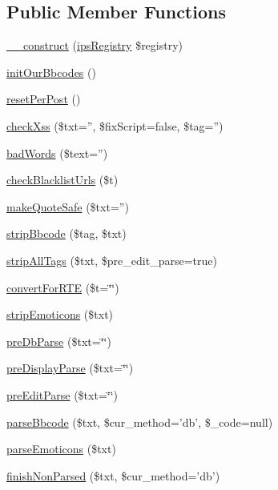\subsection*{Public Member Functions}
\begin{DoxyCompactItemize}
\item 
\hyperlink{classclass__bbcode__core_a178c3a93e57e75dd87a5d39112af0b07}{\-\_\-\-\_\-construct} (\hyperlink{classips_registry}{ips\-Registry} \$registry)
\item 
\hyperlink{classclass__bbcode__core_a52d18ae76a46598ee7da83bb73c848a8}{init\-Our\-Bbcodes} ()
\item 
\hyperlink{classclass__bbcode__core_a9d93724d48cbdd221c0bf9a7d8e6a160}{reset\-Per\-Post} ()
\item 
\hyperlink{classclass__bbcode__core_ae6b04d2901a9521709b77ab1e610827e}{check\-Xss} (\$txt='', \$fix\-Script=false, \$tag='')
\item 
\hyperlink{classclass__bbcode__core_a3c1450b996765a2c9791d59e543043af}{bad\-Words} (\$text='')
\item 
\hyperlink{classclass__bbcode__core_acc647870f282d982a13c31a065b9fbf2}{check\-Blacklist\-Urls} (\$t)
\item 
\hyperlink{classclass__bbcode__core_a5f6600d91d480e9d4cb41638af91129a}{make\-Quote\-Safe} (\$txt='')
\item 
\hyperlink{classclass__bbcode__core_a26a7bf3ee2c80161c1d154c7cb4e1ca1}{strip\-Bbcode} (\$tag, \$txt)
\item 
\hyperlink{classclass__bbcode__core_ad3cacd4e2b0fe215a49b5bbca7f3a565}{strip\-All\-Tags} (\$txt, \$pre\-\_\-edit\-\_\-parse=true)
\item 
\hyperlink{classclass__bbcode__core_a774298b1c6ee1b64ecd80f9913208fe7}{convert\-For\-R\-T\-E} (\$t=\char`\"{}\char`\"{})
\item 
\hyperlink{classclass__bbcode__core_a045622830087c0e3df475d390a07afdc}{strip\-Emoticons} (\$txt)
\item 
\hyperlink{classclass__bbcode__core_aea1919f4d4d425b66d1a63314da38aaf}{pre\-Db\-Parse} (\$txt=\char`\"{}\char`\"{})
\item 
\hyperlink{classclass__bbcode__core_abbb08647886418bf857c94e5f4262423}{pre\-Display\-Parse} (\$txt=\char`\"{}\char`\"{})
\item 
\hyperlink{classclass__bbcode__core_ad3d23bc194e2cb81f6387acb027597cd}{pre\-Edit\-Parse} (\$txt=\char`\"{}\char`\"{})
\item 
\hyperlink{classclass__bbcode__core_a1e9f54bbc296353c541a17ea46a9176b}{parse\-Bbcode} (\$txt, \$cur\-\_\-method='db', \$\-\_\-code=null)
\item 
\hyperlink{classclass__bbcode__core_ad5ee998ebedefee5fac1f67c5c1f81a2}{parse\-Emoticons} (\$txt)
\item 
\hyperlink{classclass__bbcode__core_aafe52fec14b9fd3cdf3404a115ad9ac3}{finish\-Non\-Parsed} (\$txt, \$cur\-\_\-method='db')
\end{DoxyCompactItemize}
